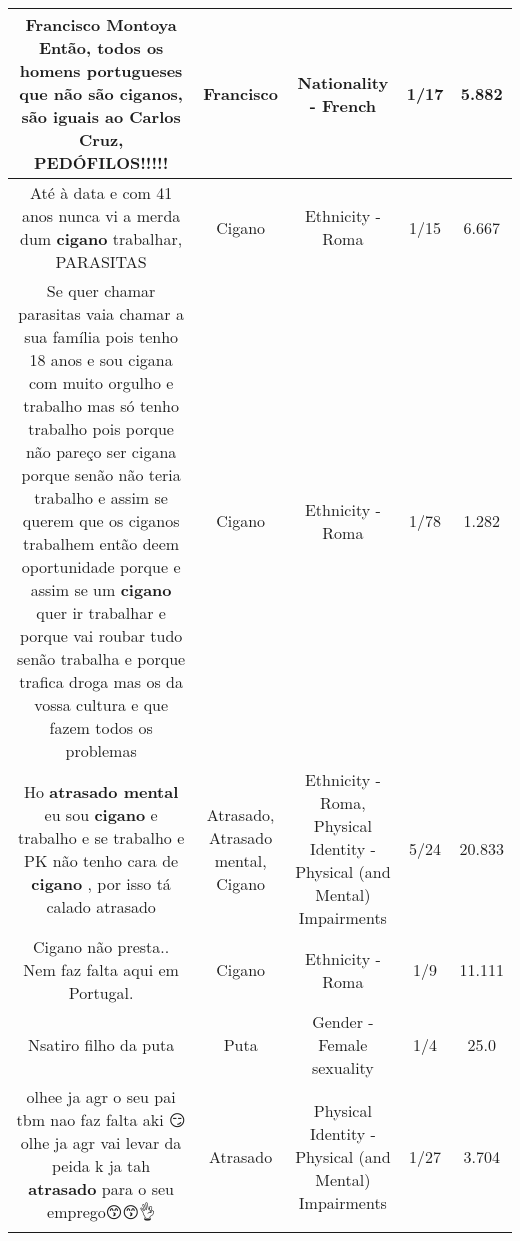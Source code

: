 \documentclass[11pt]{article}
\newlength\mylength
\begin{document}
\begin{center}
\begin{longtable}{|C{.65\mylength}|C{.30\mylength}|C{.12\mylength}|C{.12\mylength}|C{.12\mylength}|}
  \small Francisco Montoya Então, todos os homens portugueses que não são ciganos, são iguais ao Carlos Cruz, PEDÓFILOS!!!!!\normalsize   & Francisco & Nationality - French & 1/17 & 5.882 \\  \hline
  \small Até à data e com 41 anos nunca vi a merda dum \textbf{cigano} trabalhar, PARASITAS\normalsize   & Cigano & Ethnicity - Roma & 1/15 & 6.667 \\  \hline
  \small Se quer chamar parasitas vaia chamar a sua família pois tenho 18 anos e sou cigana com muito orgulho e trabalho mas só tenho trabalho pois porque não pareço ser cigana porque senão não teria trabalho e assim se querem que os ciganos trabalhem então deem oportunidade porque e assim se um \textbf{cigano} quer ir trabalhar e porque vai roubar tudo senão trabalha e porque trafica droga mas os da vossa cultura e que fazem todos os problemas\normalsize   & Cigano & Ethnicity - Roma & 1/78 & 1.282 \\  \hline
  \small Ho \textbf{a\textbf{trasado} mental} eu sou \textbf{cigano} e trabalho e se trabalho e PK não tenho cara de \textbf{cigano} , por isso tá calado atrasado\normalsize   & Atrasado, Atrasado mental, Cigano & Ethnicity - Roma, Physical Identity - Physical (and Mental) Impairments & 5/24 & 20.833 \\  \hline
  \small Cigano não presta.. Nem faz falta aqui em Portugal.\normalsize   & Cigano & Ethnicity - Roma & 1/9 & 11.111 \\  \hline
  \small Nsatiro filho da puta\normalsize   & Puta & Gender - Female sexuality & 1/4 & 25.0 \\  \hline
  \small olhee ja agr o seu pai tbm nao faz falta aki 😏 olhe ja agr vai levar da peida k  ja tah \textbf{atrasado} para o seu emprego😙😙👌\normalsize   & Atrasado & Physical Identity - Physical (and Mental) Impairments & 1/27 & 3.704 \\  \hline

\end{longtable}
\end{center}
\end{document}
